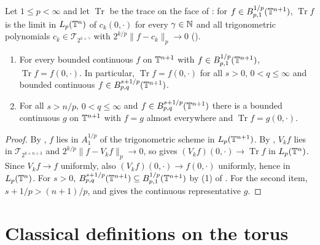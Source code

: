 \begin{theorem}
\label{thm:trace-torus-continuous}
\leanok
{}
Let $1 \leq p < \infty$ and let $\operatorname{Tr}$ be the trace on the face of
: for $f \in B^{1/p}_{p,1}(\mathbb{T}^{n+1})$, $\operatorname{Tr} f$ is the limit
in $L_p(\mathbb{T}^n)$ of $c_k(0, \cdot)$ for every $\gamma \in \mathbb{N}$ and all trigonometric polynomials
$c_k \in \mathcal{T}_{2^{k+\gamma}}$ with $2^{k/p} \|f - c_k\|_p \to 0$ ().
\begin{enumerate}
  \item For every bounded continuous $f$ on $\mathbb{T}^{n+1}$ with
    $f \in B^{1/p}_{p,1}(\mathbb{T}^{n+1})$, $\operatorname{Tr} f = f(0, \cdot)$. In particular,
    $\operatorname{Tr} f = f(0, \cdot)$ for all $s > 0$, $0 < q \leq \infty$ and bounded
    continuous $f \in B^{s+1/p}_{p,q}(\mathbb{T}^{n+1})$.
  \item For all $s > n/p$, $0 < q \leq \infty$ and $f \in B^{s+1/p}_{p,q}(\mathbb{T}^{n+1})$
    there is a bounded continuous $g$ on $\mathbb{T}^{n+1}$ with $f = g$ almost everywhere and
    $\operatorname{Tr} f = g(0, \cdot)$.
\end{enumerate}
\end{theorem}

\begin{proof}
\leanok
{}
By , $f$ lies in $A^{1/p}_1$ of the trigonometric scheme in
$L_p(\mathbb{T}^{n+1})$. By , $V_k f$ lies in $\mathcal{T}_{2^{k+n+3}}$ and
$2^{k/p} \|f - V_k f\|_p \to 0$, so  gives
$(V_k f)(0, \cdot) \to \operatorname{Tr} f$ in $L_p(\mathbb{T}^n)$. Since $V_k f \to f$ uniformly,
also $(V_k f)(0, \cdot) \to f(0, \cdot)$ uniformly, hence in $L_p(\mathbb{T}^n)$. For $s > 0$,
$B^{s+1/p}_{p,q}(\mathbb{T}^{n+1}) \subseteq B^{1/p}_{p,1}(\mathbb{T}^{n+1})$ by (1) of
. For the second item,
$s + 1/p > (n+1)/p$, and  gives the continuous representative $g$.
\end{proof}

\chapter{Classical definitions on the torus}
\label{ch:classical}


